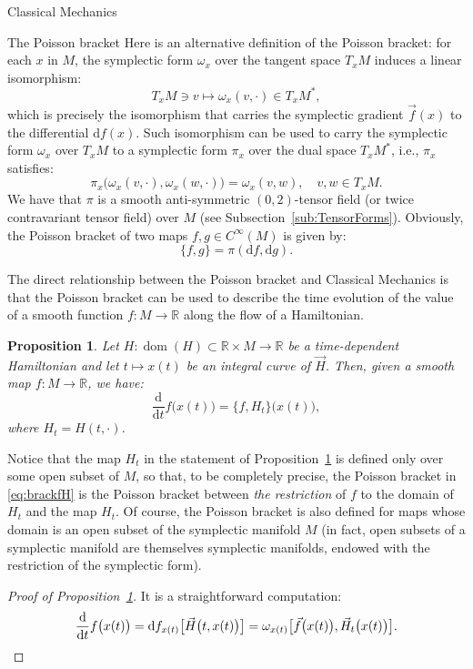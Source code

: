 \documentclass[oneside,a4paper,11pt]{amsbook}
\newcommand{\R}{\mathds R}
\newcommand{\dd}{\mathrm d}
\DeclareMathOperator{\Dom}{dom}
\theoremstyle{remark}\newtheorem{exercise}{Exercise}[chapter]
\theoremstyle{plain}\newtheorem{teo}{Theorem}[section]
\theoremstyle{plain}\newtheorem{lem}[teo]{Lemma}
\theoremstyle{plain}\newtheorem{prop}[teo]{Proposition}
\theoremstyle{plain}\newtheorem{cor}[teo]{Corollary}
\theoremstyle{definition}\newtheorem{defin}[teo]{Definition}
\theoremstyle{remark}\newtheorem{rem}[teo]{Remark}
\theoremstyle{definition}\newtheorem{notation}[teo]{Notation}
\theoremstyle{definition}\newtheorem{convention}[teo]{Convention}
\theoremstyle{definition}\newtheorem{example}[teo]{Example}
\numberwithin{section}{chapter}
\numberwithin{equation}{section}
\begin{document}
\begin{chapter}{Classical Mechanics}
\begin{section}{The Poisson bracket}
Here is an alternative definition of the Poisson bracket: for each $x$ in $M$, the symplectic form $\omega_x$
over the tangent space $T_xM$ induces a linear isomorphism:
\[T_xM\ni v\longmapsto\omega_x(v,\cdot)\in T_xM^*,\]
which is precisely the isomorphism that carries the symplectic gradient $\vec f(x)$ to the differential $\dd f(x)$.
Such isomorphism can be used to carry the symplectic form $\omega_x$ over $T_xM$ to a symplectic form $\pi_x$ over the dual
space $T_xM^*$, i.e., $\pi_x$ satisfies:
\[\pi_x\big(\omega_x(v,\cdot),\omega_x(w,\cdot)\big)=\omega_x(v,w),\quad v,w\in T_xM.\]
We have that $\pi$ is a smooth anti-symmetric $(0,2)$-tensor field (or twice contravariant tensor field)
over $M$ (see Subsection~\ref{sub:TensorForms}). Obviously, the Poisson bracket of two maps $f,g\in C^\infty(M)$ is given by:
\[\{f,g\}=\pi(\dd f,\dd g).\]

The direct relationship between the Poisson bracket and Classical Mechanics is that the Poisson bracket can be used to describe the time evolution of
the value of a smooth function $f:M\to\R$ along the flow of a Hamiltonian.
\begin{prop}\label{thm:derfvecH}
Let $H:\Dom(H)\subset\R\times M\to\R$ be a time-dependent Hamiltonian and let $t\mapsto x(t)$ be an integral
curve of $\vec H$. Then, given a smooth map $f:M\to\R$, we have:
\begin{equation}\label{eq:brackfH}
\frac{\dd}{\dd t}f\big(x(t)\big)=\{f,H_t\}\big(x(t)\big),
\end{equation}
where $H_t=H(t,\cdot)$.
\end{prop}

Notice that the map $H_t$ in the statement of Proposition~\ref{thm:derfvecH}
is defined only over some open subset of $M$, so that, to be completely precise,
the Poisson bracket in \eqref{eq:brackfH} is the Poisson bracket between {\em the restriction\/} of $f$ to the domain of $H_t$
and the map $H_t$. Of course, the Poisson bracket is also defined for maps whose domain is an open subset of the
symplectic manifold $M$ (in fact, open subsets of a symplectic manifold are themselves symplectic manifolds,
endowed with the restriction of the symplectic form).

\begin{proof}[Proof of Proposition~\ref{thm:derfvecH}]
It is a straightforward computation:
\[\frac{\dd}{\dd t}f\big(x(t)\big)=\dd f_{x(t)}\big[\vec H\big(t,x(t)\big)\big]=
\omega_{x(t)}\big[\vec f\big(x(t)\big),\vec H_t\big(x(t)\big)\big].\qedhere\]
\end{proof}


\end{section}
\end{chapter}
\end{document}
